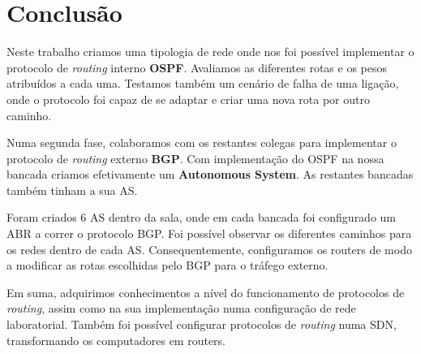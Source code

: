 \chapter{Conclusão} \label{sec:conclusion}

Neste trabalho criamos uma tipologia de rede onde nos foi possível implementar o protocolo de \textit{routing} interno \textbf{OSPF}.
Avaliamos as diferentes rotas e os pesos atribuídos a cada uma.
Testamos também um cenário de falha de uma ligação, onde o protocolo foi capaz de se adaptar e criar uma nova rota  por outro caminho.

Numa segunda fase, colaboramos com os restantes colegas para implementar o protocolo de \textit{routing} externo \textbf{BGP}.
Com implementação do OSPF na nossa bancada criamos efetivamente um \textbf{Autonomous System}. As restantes bancadas também tinham a sua AS.

Foram criados 6 AS dentro da sala, onde em cada bancada foi configurado um ABR a correr o protocolo BGP.
Foi possível observar os diferentes caminhos para os redes dentro de cada AS.
Consequentemente, configuramos os routers de modo a modificar as rotas escolhidas pelo BGP para o tráfego externo.

Em suma, adquirimos conhecimentos a nível do funcionamento de protocolos de \textit{routing}, assim como na sua implementação numa configuração de rede laboratorial.
Também foi possível configurar protocolos de \textit{routing} numa SDN, transformando os computadores em routers.
